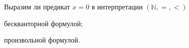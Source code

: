 Выразим ли предикат $x = 0$ в интерпретации $(\mathbb{N}, =, <)$
\begin{enumcyr}
    \item бескванторной формулой;
    \item произвольной формулой.
\end{enumcyr}